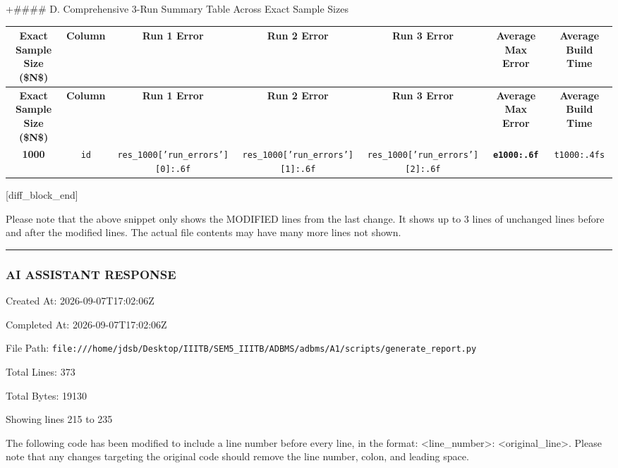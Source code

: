 \documentclass[11pt,a4paper]{article}
\begin{document}
+\#\#\#\# D. Comprehensive 3-Run Summary Table Across Exact Sample Sizes

{\begingroup
\footnotesize
\setlength{\tabcolsep}{3.5pt}
\begin{xltabular}{\textwidth}{C | C | C | C | C | C | C}
\toprule
\textbf{Exact Sample Size (\$N\$)} & \textbf{Column} & \textbf{Run 1 Error} & \textbf{Run 2 Error} & \textbf{Run 3 Error} & \textbf{\textbf{Average Max Error}} & \textbf{Average Build Time} \\
\midrule
\endfirsthead
\toprule
\textbf{Exact Sample Size (\$N\$)} & \textbf{Column} & \textbf{Run 1 Error} & \textbf{Run 2 Error} & \textbf{Run 3 Error} & \textbf{\textbf{Average Max Error}} & \textbf{Average Build Time} \\
\midrule
\endfirsthead
\endhead
\bottomrule
\endfoot
\bottomrule
\endlastfoot
\textbf{1000} & \texttt{id} & \texttt{{res\_1000['run\_errors'][0]:.6f}} & \texttt{{res\_1000['run\_errors'][1]:.6f}} & \texttt{{res\_1000['run\_errors'][2]:.6f}} & \textbf{\texttt{{e1000:.6f}}} & \texttt{{t1000:.4f}s} \\
\end{xltabular}
\endgroup}

[diff\_block\_end]


Please note that the above snippet only shows the MODIFIED lines from the last change. It shows up to 3 lines of unchanged lines before and after the modified lines. The actual file contents may have many more lines not shown.


\hrule

\subsubsection{AI ASSISTANT RESPONSE}

Created At: 2026-09-07T17:02:06Z

Completed At: 2026-09-07T17:02:06Z

File Path: \texttt{file:///home/jdsb/Desktop/IIITB/SEM5\_IIITB/ADBMS/adbms/A1/scripts/generate\_report.py}

Total Lines: 373

Total Bytes: 19130

Showing lines 215 to 235

The following code has been modified to include a line number before every line, in the format: <line\_number>: <original\_line>. Please note that any changes targeting the original code should remove the line number, colon, and leading space.
\end{document}
